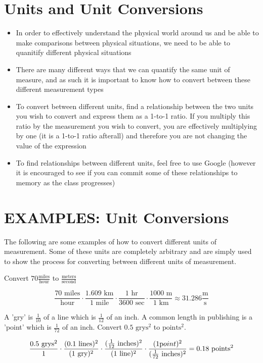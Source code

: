\section{Units and Unit Conversions}

\begin{itemize}
	\item In order to effectively understand the physical world around us and be able to make comparisons between physical situations, we need to be able to quanitify different physical situations
	\item There are many different ways that we can quantify the same unit of measure, and as such it is important to know how to convert between these different measurement types 
	\item To convert between different units, find a relationship between the two units you wish to convert and express them as a 1-to-1 ratio. If you multiply this ratio by the measurement you wish to convert, you are effectively multiplying by one (it is a 1-to-1 ratio afterall) and therefore you are not changing the value of the expression
	\item To find relationships between different units, feel free to use Google (however it is encouraged to see if you can commit some of these relationships to memory as the class progresses)
\end{itemize}

\section{EXAMPLES: Unit Conversions}

The following are some examples of how to convert different units of measurement. Some of these units are completely arbitrary and are simply used to show the process for converting between different units of measurement.

\begin{problem}	
	Convert $70 \frac{\text{miles}}{\text{hour}}$ to $\frac{\text{meters}}{\text{second}}$
 
	$$
	\frac{70\text{ miles}}{\text{hour}}\cdot\frac{1.609 \text{ km}}{1 \text{ mile}}\cdot\frac{1 \text{ hr}}{3600 \text{ sec}}\cdot\frac{1000 \text{ m}}{1 \text{ km}} \approx 31.286 \frac{\text{m}}{\text{s}}
	$$
\end{problem}\newpage

\begin{problem}
	A 'gry' is $\frac{1}{10}$ of a line which is $\frac{1}{12}$ of an inch. A common length in publishing is a 'point' which is $\frac{1}{72}$ of an inch. Convert $0.5\text{ grys}^2$ to $\text{points}^2$.

	$$
	\frac{0.5\text{ grys}^2}{1}\cdot\frac{(0.1\text{ lines})^2}{(1
	\text{ gry})^2}\cdot\frac{(\frac{1}{12}\text{ inches})^2}{(1\text{ line})^2}\cdot\frac{(1\text point)^2}{(\frac{1}{72}\text{ inches})^2} = 0.18\text{ points}^2
	$$
\end{problem}

